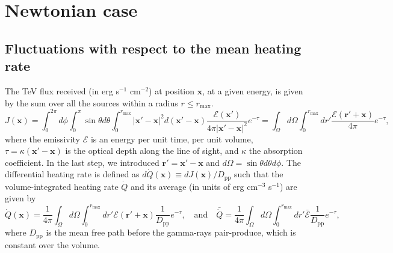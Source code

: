 \documentclass[numberedappendix]{emulateapj}
\newcommand\ALc[1]{{\color{red} \bf #1}} %
\newcommand\Cc[1]{{\color{blue} \bf #1}} %
\begin{document}
\section {Newtonian case}\label{sec:windon_newt}
\subsection {Fluctuations with respect to the mean heating rate}

The TeV flux received (in erg s$^{-1}$ cm$^{-2}$) at position $\mathbf{x}$, at a given energy, is given by the sum over all the sources within a radius $r\leqslant r_{\mathrm{max}}$.
\begin{equation}
  \label{eq:flux_recu0}
  J(\mathbf{x})=
  \int_{0}^{2\pi}d\phi\int_{0}^{\pi}\sin\theta d\theta\int_0^{r_{\mathrm{max}}}|\mathbf{x}'-\mathbf{x}|^2 d(\mathbf{x}'-\mathbf{x})
  \frac{\mathcal{E}(\mathbf{x}') }{4\pi |\mathbf{x}'-\mathbf{x}|^2} e^{-\tau}
  =\int_{\Omega} d\Omega\int_0^{r_{\mathrm{max}}} dr' \frac{\mathcal{E}(\mathbf{r}'+\mathbf{x}) }{4\pi } e^{-\tau},
\end{equation}
where the emissivity $\mathcal{E}$ is an energy per unit time, per unit volume, $\tau=\kappa (\mathbf{x}'-\mathbf{x})$ is the optical depth along the line of sight, and $\kappa$ the absorption coefficient. In the last step, we introduced $\mathbf{r'}=\mathbf{x}'-\mathbf{x}$ and $d\Omega=\sin\theta d\theta d\phi$. The differential heating rate is defined as $d\dot{Q}(\mathbf{x})\equiv dJ(\mathbf{x})/D_{\mathrm{pp}}$ such that the volume-integrated heating rate $\dot{Q}$ and its average (in units of erg cm$^{-3}$ s$^{-1}$) are given by 
\begin{equation}
  \label{eq:heating_rate0}
  \dot{Q}(\mathbf{x})=
  \frac{1}{4\pi}   \int_{\Omega}d\Omega\int_0^{r_{\mathrm{max}}} dr' \mathcal{E}(\mathbf{r}'+\mathbf{x}) \frac{1}{D_{\mathrm{pp}}} e^{-\tau},\quad\mbox{and}\quad
  \bar{\dot{Q}}= \frac{1}{4\pi}   \int_{\Omega}d\Omega\int_0^{r_{\mathrm{max}}} dr' \bar{\mathcal{E}} \frac{1}{D_{\mathrm{pp}}} e^{-\tau},
\end{equation}
where $D_{\mathrm{pp}}$ is the mean free path before the gamma-rays pair-produce, which is constant over the volume.
\end{document}
